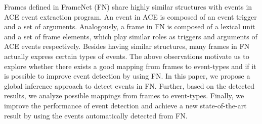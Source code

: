 Frames defined in FrameNet (FN) share highly similar structures with events in ACE event extraction program. An event in ACE is composed of an event trigger and a set of arguments. Analogously, a frame in FN is composed of a lexical unit and a set of frame elements, which play similar roles as triggers and arguments of ACE events respectively. Besides having similar structures, many frames in FN actually express certain types of events. The above observations motivate us to explore whether there exists a good mapping from frames to event-types and if it is possible to improve event detection by using FN. In this paper, we propose a global inference approach to detect events in FN. Further, based on the detected results, we analyze possible mappings from frames to event-types. Finally, we improve the performance of event detection and achieve a new state-of-the-art result by using the events automatically detected from FN.
